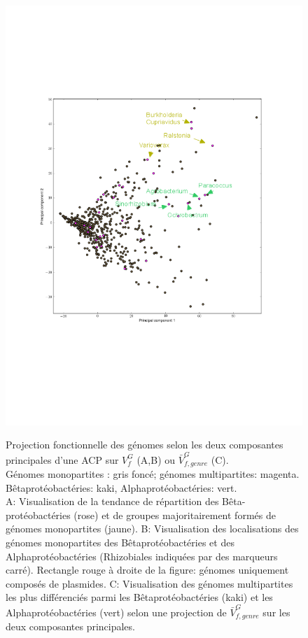 \begin{figure}
\begin{center}
\begin{minipage}{0.55\textwidth}
		\includegraphics[trim=2cm 7cm 2cm 6cm,clip,width=\textwidth]{./img/pca_genome_norm.png}
		\label{figpcavg3}
	\end{minipage}
	\caption[Projection fonctionnelle des génomes selon les deux composantes principales d'une ACP ]{Projection fonctionnelle des génomes selon les deux composantes principales d'une ACP sur $V^{G}_{f}$ (A,B) ou  $\bar{V}^{G}_{f,genre}$ (C). \\ Génomes monopartites : gris foncé; génomes multipartites: magenta. Bêtaprotéobactéries: kaki, Alphaprotéobactéries: vert.\\
A: Visualisation de la tendance de répartition des Bêta-protéobactéries (rose) et de groupes majoritairement formés de génomes monopartites (jaune). B: Visualisation des localisations des génomes monopartites des Bêtaprotéobactéries et des Alphaprotéobactéries (Rhizobiales indiquées par des marqueurs carré). Rectangle rouge à droite de la figure: génomes uniquement composés de plasmides. C: Visualisation des génomes multipartites les plus différenciés parmi les Bêtaprotéobactéries (kaki) et les Alphaprotéobactéries (vert) selon une projection de $\bar{V}^{G}_{f,genre}$ sur les deux composantes principales.} \label{figpcagenome}
	\end{center}
\end{figure}
	  	

